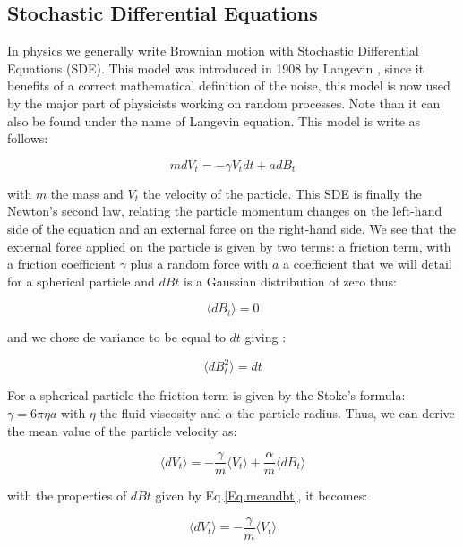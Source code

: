 \subsection{Stochastic Differential Equations}

In physics we generally write Brownian motion with Stochastic Differential Equations (\gls{SDE}). This model was introduced in 1908 by Langevin \cite{langevin_sur_1908}, since it benefits of a correct mathematical definition of the noise, this model is now used by the major part of physicists working on random processes. Note than it can also be found under the name of Langevin equation. This model is write as follows:

\begin{equation}
	mdV_t  = - \gamma V_t dt + adB_t 
\end{equation}

with $m$ the mass and $V_t$ the velocity of the particle. This \gls{SDE} is finally the Newton's second law, relating the particle momentum changes on the left-hand side of the equation and an external force on the right-hand side. We see that the external force applied on the particle is given by two terms: a friction term, with a friction coefficient $\gamma$ plus a random force with $a$ a coefficient that we will detail for a spherical particle and $dBt$ is a Gaussian distribution of zero thus:

\begin{equation}
	\langle dB_t \rangle  = 0
	\label{Eq.meandbt}
\end{equation}

and we chose de variance to be equal to $dt$ giving : 

\begin{equation}
	\langle dB_t ^2 \rangle = dt
\end{equation}

For a spherical particle the friction term is given by the Stoke's formula: $\gamma = 6\pi \eta a$ with $\eta$ the fluid viscosity and $\alpha$ the particle radius. Thus, we can derive the mean value of the particle velocity as:

\begin{equation}
	\langle dV_t \rangle = - \frac{\gamma}{m} \langle V_t \rangle + \frac{\alpha}{m} \langle dB_t \rangle
\end{equation}

with the properties of $dBt$ given by Eq.\ref{Eq.meandbt}, it becomes:

\begin{equation}
	\langle dV_t \rangle = - \frac{\gamma}{m} \langle V_t \rangle 
\end{equation}

